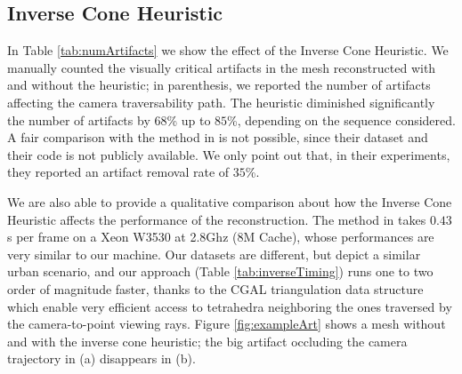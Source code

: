

\subsection{Inverse Cone Heuristic}
In Table \ref{tab:numArtifacts} we show the effect of the Inverse Cone Heuristic. We manually counted the visually critical artifacts in the mesh reconstructed with and without the heuristic; in parenthesis, we reported the number of artifacts affecting the camera traversability path. The heuristic diminished significantly the number of artifacts by $68$\% up to $85$\%, depending on the sequence considered. 
A fair comparison with the method in \cite{litvinov_Lhiuller14} is not possible, since their dataset and their code is not publicly available. We only point out that, in their experiments, they reported \cite{litvinov_Lhiuller14} an artifact removal rate of $35$\%.


We are also able to provide a qualitative comparison about how the Inverse Cone Heuristic affects the performance of the reconstruction. The method in \cite{litvinov_Lhiuller14} takes $0.43$s per frame on a Xeon W3530 at 2.8Ghz (8M Cache), whose performances are very similar to our machine.  Our datasets are different, but depict a similar urban scenario, and our approach (Table \ref{tab:inverseTiming}) runs one to two order of magnitude faster, thanks to the CGAL \cite{cgal} triangulation data structure which enable very efficient access to  tetrahedra neighboring the ones traversed by the camera-to-point viewing rays. 
Figure \ref{fig:exampleArt} shows a mesh without and with the inverse cone heuristic; the big artifact occluding the camera trajectory in (a) disappears in (b).
 


